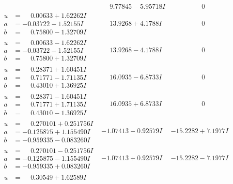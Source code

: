 \documentclass[1p]{elsarticle_modified}
\theoremstyle{definition}
\begin{document}
$$\begin{array}{c|c|c}
 & \phantom{-}9.77845 - 5.95718 I & \phantom{-0.000000 } 0 \\ \hline\begin{aligned}
u &= \phantom{-}0.00633 + 1.62262 I \\
a &= -0.03722 + 1.52155 I \\
b &= \phantom{-}0.75800 - 1.32709 I\end{aligned}
 & \phantom{-}13.9268 + 4.1788 I & \phantom{-0.000000 } 0 \\ \hline\begin{aligned}
u &= \phantom{-}0.00633 - 1.62262 I \\
a &= -0.03722 - 1.52155 I \\
b &= \phantom{-}0.75800 + 1.32709 I\end{aligned}
 & \phantom{-}13.9268 - 4.1788 I & \phantom{-0.000000 } 0 \\ \hline\begin{aligned}
u &= \phantom{-}0.28371 + 1.60451 I \\
a &= \phantom{-}0.71771 - 1.71135 I \\
b &= \phantom{-}0.43010 + 1.36925 I\end{aligned}
 & \phantom{-}16.0935 - 6.8733 I & \phantom{-0.000000 } 0 \\ \hline\begin{aligned}
u &= \phantom{-}0.28371 - 1.60451 I \\
a &= \phantom{-}0.71771 + 1.71135 I \\
b &= \phantom{-}0.43010 - 1.36925 I\end{aligned}
 & \phantom{-}16.0935 + 6.8733 I & \phantom{-0.000000 } 0 \\ \hline\begin{aligned}
u &= \phantom{-}0.270101 + 0.251756 I \\
a &= -0.125875 + 1.155490 I \\
b &= -0.959335 - 0.083260 I\end{aligned}
 & -1.07413 - 0.92579 I & -15.2282 + 7.1977 I \\ \hline\begin{aligned}
u &= \phantom{-}0.270101 - 0.251756 I \\
a &= -0.125875 - 1.155490 I \\
b &= -0.959335 + 0.083260 I\end{aligned}
 & -1.07413 + 0.92579 I & -15.2282 - 7.1977 I \\ \hline\begin{aligned}
u &= \phantom{-}0.30549 + 1.62589 I \\

\end{aligned}
\end{array}$$
\end{document}
